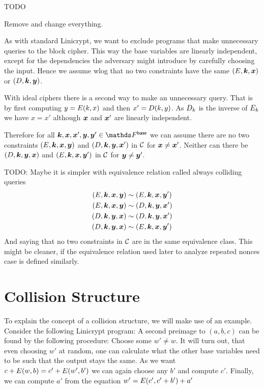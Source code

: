 TODO

Remove and change everything.

As with standard Linicrypt,
we want to exclude programs that make unnecessary queries to the block cipher.
This way the base variables are linearly independent,
except for the dependencies the adversary might introduce by carefully choosing the input.
Hence we assume wlog that no two constraints have the same $(E, \boldsymbol k, \boldsymbol x)$ or $(D, \boldsymbol k, \boldsymbol y)$.

With ideal ciphers there is a second way to make an unnecessary query.
That is by first computing $y = E(k,x)$ and then $x' = D(k, y)$.
As $D_k$ is the inverse of $E_k$ we have $x = x'$ although $\boldsymbol x$ and $\boldsymbol x'$ are linearly independent.


Therefore for all $\v k, \v x, \v x', \v y, \v y' \in \Base$ we can assume there are no two constraints
$(E, \boldsymbol k,\boldsymbol x, \boldsymbol y)$ and $(D, \boldsymbol k, \boldsymbol y, \boldsymbol x')$ in $\mathcal{C}$ for $\boldsymbol x \neq \boldsymbol x'$.
Neither can there be $(D, \boldsymbol k,\boldsymbol y, \boldsymbol x)$ and $(E, \boldsymbol k, \boldsymbol x, \boldsymbol y')$ in $\mathcal{C}$ for $\boldsymbol y \neq \boldsymbol y'$.

TODO: Maybe it is simpler with equivalence relation called always colliding queries
\begin{align*}
    (E, \boldsymbol k,\boldsymbol x, \boldsymbol y) &\sim (E, \boldsymbol k, \boldsymbol x, \boldsymbol y') \\ 
    (E, \boldsymbol k,\boldsymbol x, \boldsymbol y) &\sim (D, \boldsymbol k, \boldsymbol y, \boldsymbol x') \\
    (D, \boldsymbol k,\boldsymbol y, \boldsymbol x) &\sim (D, \boldsymbol k, \boldsymbol y, \boldsymbol x') \\
    (D, \boldsymbol k,\boldsymbol y, \boldsymbol x) &\sim (E, \boldsymbol k, \boldsymbol x, \boldsymbol y')
\end{align*}
And saying that no two constraints in $\mathcal{C}$ are in the same equivalence class.
This might be cleaner, if the equivalence relation used later to analyze repeated nonces case is defined similarly.

\section{Collision Structure}

To explain the concept of a collision structure, we will make use of an example.
Consider the following Linicrypt program:
A second preimage to $(a,b,c)$ can be found by the following procedure:
Choose some $w' \neq w$.
It will turn out, that even choosing $w'$ at random,
one can calculate what the other base variables need to be such that the output stays the same.
As we want $c + E(w,b) = c' + E(w', b')$ we can again choose any $b'$ and compute $c'$. 
Finally, we can compute $a'$ from the equation $w' = E(c', c' + b') + a'$

